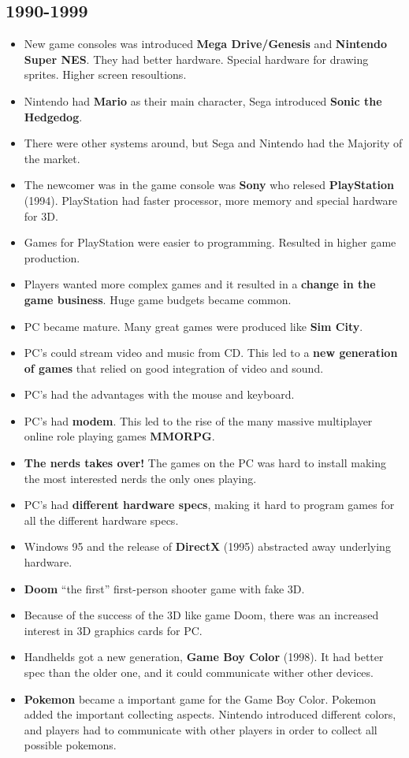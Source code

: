   \subsection*{1990-1999}
    \begin{itemize}
      \item New game consoles was introduced {\bf Mega Drive/Genesis} and {\bf Nintendo Super NES}. They had better hardware. Special hardware for drawing sprites. Higher screen resoultions.
      \item Nintendo had {\bf Mario} as their main character, Sega introduced {\bf Sonic the Hedgedog}.
      \item There were other systems around, but Sega and Nintendo had the Majority of the market.
      \item The newcomer was in the game console was {\bf Sony} who relesed {\bf PlayStation} (1994). PlayStation had faster processor, more memory and special hardware for 3D. 
      \item Games for PlayStation were easier to programming. Resulted in higher game production. 
      \item Players wanted more complex games and it resulted in a {\bf change in the game business}. Huge game budgets became common. 
      \item PC became mature. Many great games were produced like {\bf Sim City}.
      \item PC's could stream video and music from CD. This led to a {\bf new generation of games} that relied on good integration of video and sound. 
      \item PC's had the advantages with the mouse and keyboard. 
      \item PC's had {\bf modem}. This led to the rise of the many massive multiplayer online role playing games  {\bf MMORPG}. 
      \item {\bf The nerds takes over!} The games on the PC was hard to install making the most interested nerds the only ones playing. 
      \item PC's had {\bf different hardware specs}, making it hard to program games for all the different hardware specs. 
      \item Windows 95 and the release of {\bf DirectX} (1995) abstracted away underlying hardware. 
      \item {\bf Doom} ``the first'' first-person shooter game with fake 3D. 
      \item Because of the success of the 3D like game Doom, there was an increased interest in 3D graphics cards for PC.
      \item Handhelds got a new generation, {\bf Game Boy Color} (1998). It had better spec than the older one, and it could communicate wither other devices. 
      \item {\bf Pokemon} became a important game for the Game Boy Color. Pokemon added the important collecting aspects. Nintendo introduced different colors, and players had to communicate with other players in order to collect all possible pokemons. 
    \end{itemize}

